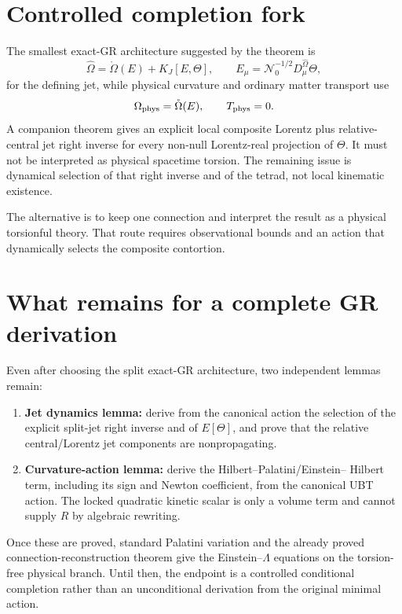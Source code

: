 \documentclass[11pt,a4paper]{article}
\begin{document}
\section{Controlled completion fork}
The smallest exact-GR architecture suggested by the theorem is
\begin{equation}
 \widehat\Omega=\mathring\Omega(E)+K_J[E,\Theta],
 \qquad
 E_\mu=\mathcal N_0^{-1/2}D^{\widehat\Omega}_\mu\Theta,
 \label{eq:jet}
\end{equation}
for the defining jet, while physical curvature and ordinary matter transport
use
\begin{equation}
 \Omega_{\rm phys}=\mathring\Omega(E),
 \qquad T_{\rm phys}=0.
 \label{eq:phys}
\end{equation}
A companion theorem gives an explicit local composite Lorentz plus relative-
central jet right inverse for every non-null Lorentz-real projection of
$\Theta$.  It must not be interpreted as physical spacetime torsion.  The
remaining issue is dynamical selection of that right inverse and of the tetrad,
not local kinematic existence.

The alternative is to keep one connection and interpret the result as a
physical torsionful theory.  That route requires observational bounds and an
action that dynamically selects the composite contortion.

\section{What remains for a complete GR derivation}
Even after choosing the split exact-GR architecture, two independent lemmas
remain:
\begin{enumerate}
 \item \textbf{Jet dynamics lemma:} derive from the canonical action the
 selection of the explicit split-jet right inverse and of $E[\Theta]$, and
 prove that the relative central/Lorentz jet components are nonpropagating.
 \item \textbf{Curvature-action lemma:} derive the Hilbert--Palatini/Einstein--
 Hilbert term, including its sign and Newton coefficient, from the canonical
 UBT action.  The locked quadratic kinetic scalar is only a volume term and
 cannot supply $R$ by algebraic rewriting.
\end{enumerate}
Once these are proved, standard Palatini variation and the already proved
connection-reconstruction theorem give the Einstein--$\Lambda$ equations on
the torsion-free physical branch.  Until then, the endpoint is a controlled
conditional completion rather than an unconditional derivation from the
original minimal action.
\end{document}
